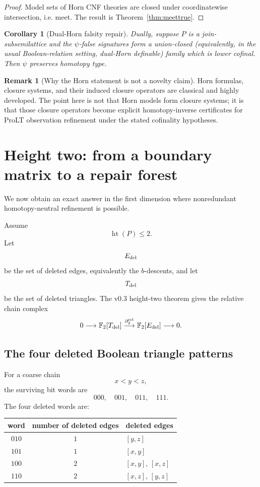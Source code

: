 \documentclass[11pt]{article}
\newtheorem{corollary}[theorem]{Corollary}
\theoremstyle{definition}
\newtheorem{remark}[theorem]{Remark}
\newcommand{\F}{\mathbb F_2}
\begin{document}
\begin{proof}
Model sets of Horn CNF theories are closed under coordinatewise intersection, i.e. meet. The result is Theorem~\ref{thm:meettrue}.
\end{proof}

\begin{corollary}[Dual-Horn falsity repair]
Dually, suppose $P$ is a join-subsemilattice and the $\psi$-false signatures form a union-closed (equivalently, in the usual Boolean-relation setting, dual-Horn definable) family which is lower cofinal. Then $\psi$ preserves homotopy type.
\end{corollary}

\begin{remark}[Why the Horn statement is not a novelty claim]
Horn formulas, closure systems, and their induced closure operators are classical and highly developed. The point here is not that Horn models form closure systems; it is that those closure operators become explicit homotopy-inverse certificates for ProLT observation refinement under the stated cofinality hypotheses.
\end{remark}

\section{Height two: from a boundary matrix to a repair forest}

We now obtain an exact answer in the first dimension where nonredundant homotopy-neutral refinement is possible.

Assume
\[
\operatorname{ht}(P)\le2.
\]
Let
\[
E_{\rm del}
\]
be the set of deleted edges, equivalently the $b$-descents, and let
\[
T_{\rm del}
\]
be the set of deleted triangles. The v0.3 height-two theorem gives the relative chain complex
\[
0\longrightarrow
\F[T_{\rm del}]
\overset{\partial_2^{\rm rel}}{\longrightarrow}
\F[E_{\rm del}]
\longrightarrow0.
\]

\subsection{The four deleted Boolean triangle patterns}

For a coarse chain
\[
x<y<z,
\]
the surviving bit words are
\[
000,\quad001,\quad011,\quad111.
\]
The four deleted words are:

\begin{center}
\begin{tabular}{ccl}
\toprule
word & number of deleted edges & deleted edges \\
\midrule
$010$ & $1$ & $[y,z]$ \\
$101$ & $1$ & $[x,y]$ \\
$100$ & $2$ & $[x,y],\,[x,z]$ \\
$110$ & $2$ & $[x,z],\,[y,z]$ \\
\bottomrule
\end{tabular}
\end{center}
\end{document}
